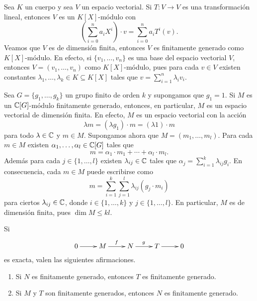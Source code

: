 \begin{example}
Sea $K$ un cuerpo y sea 
$V$ un espacio vectorial. Si $T\colon V\to V$ es una transformación
lineal, entonces $V$ es un 
$K[X]$-módulo con
\[
\left(\sum_{i=0}^n a_iX^i\right)\cdot v=
\sum_{i=0}^n a_iT^i(v).
\]
Veamos que $V$ es de dimensión finita, entonces $V$ es finitamente generado como $K[X]$-módulo. En efecto,
si $\{v_1,\dots,v_n\}$ es una base del espacio vectorial $V$, entonces
$V=(v_1,\dots,v_n)$ como $K[X]$-módulo, pues para cada $v\in V$ existen constantes 
$\lambda_1,\dots,\lambda_k\in K\subseteq K[X]$ tales que 
$v=\sum_{i=1}^n\lambda_i v_i$.    
\end{example}

\begin{example}
Sea $G=\{g_1,\dots,g_k\}$ un grupo finito de orden $k$ y supongamos que $g_1=1$.  
Si $M$ es un $\mathbb{C}[G]$-módulo finitamente generado, entonces, 
en particular, $M$ es un espacio vectorial de dimensión finita. En efecto,
$M$ es un espacio vectorial con la acción 
\[
\lambda m=(\lambda g_1)\cdot m=(\lambda 1)\cdot m
\]
para todo $\lambda\in\mathbb{C}$ y $m\in M$. Supongamos ahora que $M=(m_1,\dots,m_l)$. Para cada $m\in M$ 
existen $\alpha_1,\dots,\alpha_l\in\mathbb{C}[G]$ tales que 
\[
m=\alpha_1\cdot m_1+\cdots+\alpha_l\cdot m_l.
\]
Además para cada $j\in\{1,\dots,l\}$ existen $\lambda_{ij}\in\mathbb{C}$ tales que
$\alpha_j=\sum_{i=1}^k\lambda_{ij}g_i$. En consecuencia, cada $m\in M$ puede escribirse 
como 
\[
m=\sum_{i=1}^k\sum_{j=1}^l\lambda_{ij}(g_j\cdot m_i)
\]
para ciertos $\lambda_{ij}\in\mathbb{C}$, donde $i\in\{1,\dots,k\}$ y $j\in\{1,\dots,l\}$. En particular, $M$ es de dimensión finita, pues $\dim M\leq kl$.
\end{example}

\begin{proposition}
	Si  
	\[  
		\xymatrix{
        0\ar[r]
        & M
        \ar[r]^f
        & N
        \ar[r]^g
        & T\ar[r]
        & 0	
        }
     \]
     es exacta, valen las siguientes afirmaciones.
     \begin{enumerate}
     \item Si $N$ es finitamente generado, entonces $T$ es finitamente generado.
     \item Si $M$ y $T$ son finitamente generados, entonces $N$ es finitamente generado.	
     \end{enumerate}
\end{proposition}

